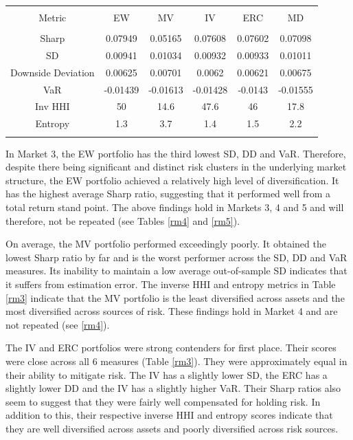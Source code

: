 \documentclass[11pt,preprint, authoryear]{elsarticle}
\let\origtable\table
\let\endorigtable\endtable
\renewenvironment{table}[1][2] {
    \expandafter\origtable\expandafter[H]
} {
    \endorigtable
}
\numberwithin{equation}{section}
\numberwithin{figure}{section}
\numberwithin{table}{section}
\begin{document}
\begin{table}[!htbp] \centering 
  \caption{Market 3 - Portfolio Risk Metrics} 
  \label{rm3} 
\begin{tabular}{@{\extracolsep{5pt}} cccccc} 
\\[-1.8ex]\hline 
\hline \\[-1.8ex] 
Metric & EW & MV & IV & ERC & MD \\ 
\hline \\[-1.8ex] 
Sharp & 0.07949 & 0.05165 & 0.07608 & 0.07602 & 0.07098 \\ 
SD & 0.00941 & 0.01034 & 0.00932 & 0.00933 & 0.01011 \\ 
Downside Deviation & 0.00625 & 0.00701 & 0.0062 & 0.00621 & 0.00675 \\ 
VaR & -0.01439 & -0.01613 & -0.01428 & -0.0143 & -0.01555 \\ 
Inv HHI & 50 & 14.6 & 47.6 & 46 & 17.8 \\ 
Entropy & 1.3 & 3.7 & 1.4 & 1.5 & 2.2 \\ 
\hline \\[-1.8ex] 
\end{tabular} 
\end{table}

In Market 3, the EW portfolio has the third lowest SD, DD and VaR.
Therefore, despite there being significant and distinct risk clusters in
the underlying market structure, the EW portfolio achieved a relatively
high level of diversification. It has the highest average Sharp ratio,
suggesting that it performed well from a total return stand point. The
above findings hold in Markets 3, 4 and 5 and will therefore, not be
repeated (see Tables \ref{rm4} and \ref{rm5}).

On average, the MV portfolio performed exceedingly poorly. It obtained
the lowest Sharp ratio by far and is the worst performer across the SD,
DD and VaR measures. Its inability to maintain a low average
out-of-sample SD indicates that it suffers from estimation error. The
inverse HHI and entropy metrics in Table \ref{rm3} indicate that the MV
portfolio is the least diversified across assets and the most
diversified across sources of risk. These findings hold in Market 4 and
are not repeated (see \ref{rm4}).

The IV and ERC portfolios were strong contenders for first place. Their
scores were close across all 6 measures (Table \ref{rm3}). They were
approximately equal in their ability to mitigate risk. The IV has a
slightly lower SD, the ERC has a slightly lower DD and the IV has a
slightly higher VaR. Their Sharp ratios also seem to suggest that they
were fairly well compensated for holding risk. In addition to this,
their respective inverse HHI and entropy scores indicate that they are
well diversified across assets and poorly diversified across risk
sources.
\end{document}
